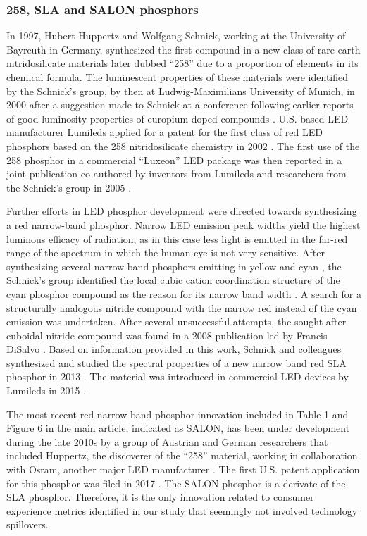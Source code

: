 \documentclass[parskip=full]{article}
\begin{document}
\subsubsection{258, SLA and SALON phosphors}

In 1997, Hubert Huppertz and Wolfgang Schnick, working at the University of Bayreuth in Germany, synthesized the first compound in a new class of rare earth nitridosilicate materials \cite{Huppertz1997} later dubbed “258” due to a proportion of elements in its chemical formula. The luminescent properties of these materials were identified by the Schnick’s group, by then at Ludwig-Maximilians University of Munich, in 2000 \cite{Hppe2000} after a suggestion made to Schnick at a conference following earlier reports of good luminosity properties of europium-doped compounds \cite{Qiua1998}. U.S.-based LED manufacturer Lumileds applied for a patent for the first class of red LED phosphors based on the 258 nitridosilicate chemistry in 2002 \cite{mueller2004phosphor}. The first use of the 258 phosphor in a commercial “Luxeon” LED package was then reported in a joint publication co-authored by inventors from Lumileds and researchers from the Schnick’s group in 2005 \cite{MuellerMach2005}.

Further efforts in LED phosphor development were directed towards synthesizing a red narrow-band phosphor. Narrow LED emission peak widths yield the highest luminous efficacy of radiation, as in this case less light is emitted in the far-red range of the spectrum in which the human eye is not very sensitive. After synthesizing several narrow-band phosphors emitting in yellow \cite{Hppe2004} and cyan \cite{Kechele2009}, the Schnick’s group identified the local cubic cation coordination structure of the cyan phosphor compound as the reason for its narrow band width \cite{lumi2016narrow}. A search for a structurally analogous nitride compound with the narrow red instead of the cyan emission was undertaken. After several unsuccessful attempts, the sought-after cuboidal nitride compound was found in a 2008 publication led by Francis DiSalvo \cite{Park2008Sr}. Based on information provided in this work, Schnick and colleagues synthesized and studied the spectral properties of a new narrow band red SLA phosphor in 2013 \cite{schmidt2013new}\cite{Pust2014}\cite{schmidt2017phosphors}. The material was introduced in commercial LED devices by Lumileds in 2015 \cite{lumi2016narrow_whitepaper}. 

The most recent red narrow-band phosphor innovation included in Table 1 and Figure 6 in the main article, indicated as SALON, has been under development during the late 2010s by a group of Austrian and German researchers that included Huppertz, the discoverer of the “258” material, working in collaboration with Osram, another major LED manufacturer \cite{seibald2019phosphor}\cite{Hoerder2019}\cite{Hoerder2020}. The first U.S. patent application for this phosphor was filed in 2017 \cite{seibald2019phosphor}. The SALON phosphor is a derivate of the SLA phosphor. Therefore, it is the only innovation related to consumer experience metrics identified in our study that seemingly not involved technology spillovers.
\end{document}
